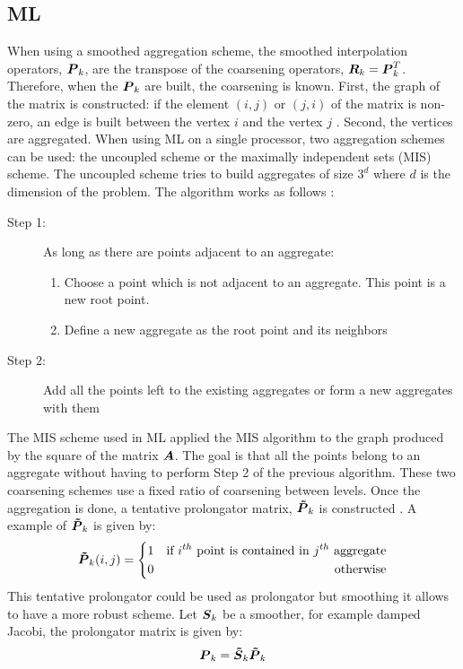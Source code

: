 \subsection{ML}
When using a smoothed aggregation scheme, the smoothed interpolation operators,
$\boldsymbol{P}_k$, are the transpose of the coarsening operators,
$\boldsymbol{R}_k=\boldsymbol{P}_k^T$. Therefore, when the $\boldsymbol{P}_k$ are built, the
coarsening is known. First, the graph of the matrix is constructed: if the element
$(i,j)$ or $(j,i)$ of the matrix is non-zero, an edge is built between the
vertex $i$ and the vertex $j$ \cite{ml_guide}. Second, the vertices are
aggregated. When using ML on a single processor, two aggregation schemes can
be used: the uncoupled scheme or the maximally independent sets (MIS) scheme. 
The uncoupled scheme tries to build aggregates of size $3^d$ where $d$ is the
dimension of the problem. The algorithm works as follows \cite{mis}:
\begin{description}
  \item[Step 1:] As long as there are points adjacent to an aggregate:
    \begin{enumerate}
      \item Choose a point which is not adjacent to an aggregate. This point
        is a new root point.
      \item Define a new aggregate as the root point and its neighbors 
    \end{enumerate}
  \item[Step 2:] Add all the points left to the existing aggregates or form a
    new aggregates with them
\end{description}
The MIS scheme used in ML applied the MIS algorithm \cite{graph_coloring} to
the graph produced by the square of the matrix $\boldsymbol{A}$. The goal is that all
the points belong to an aggregate without having to perform Step 2 of the
previous algorithm. These two coarsening schemes use a fixed ratio of 
coarsening between levels. Once the aggregation is done, a tentative
prolongator matrix, $\boldsymbol{\tilde{P}}_k$ is constructed \cite{mis}. A example of
$\boldsymbol{\tilde{P}}_k$ is given by:
\begin{equation}
  \boldsymbol{\tilde{P}}_k(i,j) = \left\{
  \begin{aligned}
    &1 &\textrm{if }i^{th}\textrm{ point is contained in }j^{th}\textrm{
    aggregate}\\
    & 0 &\textrm{otherwise}
  \end{aligned}
  \right.
\end{equation}
This tentative prolongator could be used as prolongator but smoothing it
allows to have a more robust scheme. Let $\boldsymbol{S}_k$ be a smoother, for example
damped Jacobi, the prolongator matrix is given by:
\begin{equation}
  \boldsymbol{P}_k = \boldsymbol{\tilde{S}}_k \boldsymbol{\tilde{P}}_k
\end{equation}

